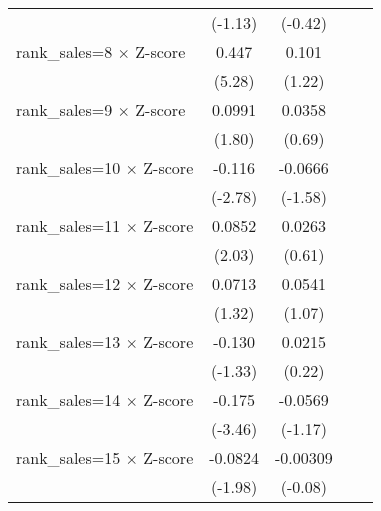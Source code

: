 {\begin{tabular}{l*{4}{c}}
                    &     (-1.13)         &     (-0.42)         &                     &                     \\
rank\_sales=8 $\times$ Z-score&       0.447\sym{***}&       0.101         &                     &                     \\
                    &      (5.28)         &      (1.22)         &                     &                     \\
rank\_sales=9 $\times$ Z-score&      0.0991         &      0.0358         &                     &                     \\
                    &      (1.80)         &      (0.69)         &                     &                     \\
rank\_sales=10 $\times$ Z-score&      -0.116\sym{**} &     -0.0666         &                     &                     \\
                    &     (-2.78)         &     (-1.58)         &                     &                     \\
rank\_sales=11 $\times$ Z-score&      0.0852\sym{*}  &      0.0263         &                     &                     \\
                    &      (2.03)         &      (0.61)         &                     &                     \\
rank\_sales=12 $\times$ Z-score&      0.0713         &      0.0541         &                     &                     \\
                    &      (1.32)         &      (1.07)         &                     &                     \\
rank\_sales=13 $\times$ Z-score&      -0.130         &      0.0215         &                     &                     \\
                    &     (-1.33)         &      (0.22)         &                     &                     \\
rank\_sales=14 $\times$ Z-score&      -0.175\sym{***}&     -0.0569         &                     &                     \\
                    &     (-3.46)         &     (-1.17)         &                     &                     \\
rank\_sales=15 $\times$ Z-score&     -0.0824\sym{*}  &    -0.00309         &                     &                     \\
                    &     (-1.98)         &     (-0.08)         &                     &                     \\

\end{tabular}}
